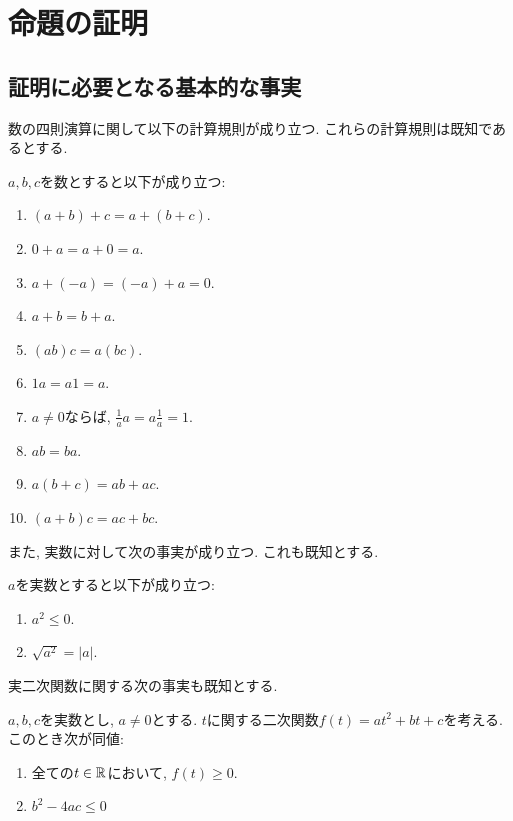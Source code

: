 

\chapter{命題の証明}
\label{chap:proof}
\section{証明に必要となる基本的な事実}
数の四則演算に関して以下の計算規則が成り立つ.
これらの計算規則は既知であるとする.
\begin{lemma}
  $a,b,c$を数とすると以下が成り立つ:
  \label{lem:numbers:field}
  \begin{enumerate}
  \item $(a+b)+c=a+(b+c)$.
  \item $0+a=a+0=a$.
  \item $a+(-a)=(-a)+a=0$.
  \item $a+b=b+a$.
  \item $(ab)c=a(bc)$.
  \item $1a=a1=a$.
  \item $a\neq 0$ならば, $\frac{1}{a}a=a\frac{1}{a}=1$.
  \item $ab=ba$.
  \item $a(b+c)=ab+ac$.
  \item $(a+b)c=ac+bc$.
  \end{enumerate}
\end{lemma}

また, 実数に対して次の事実が成り立つ.
これも既知とする.
\begin{lemma}
  $a$を実数とすると以下が成り立つ:
  \label{lem:numbers:abs}
  \begin{enumerate}
  \item $a^2\leq 0$.
  \item $\sqrt{a^2}=|a|$.
  \end{enumerate}
\end{lemma}

実二次関数に関する次の事実も既知とする.
\begin{lemma}
  \label{lem:numbers:quad}
  $a,b,c$を実数とし, $a\neq 0$とする.
  $t$に関する二次関数$f(t)=at^{2}+bt+c$を考える.
  このとき次が同値:
  \begin{enumerate}
  \item
    全ての$t\in \mathbb{R}$において, $f(t)\geq 0$.
  \item
    $b^2-4ac \leq 0$
  \end{enumerate}
\end{lemma}

